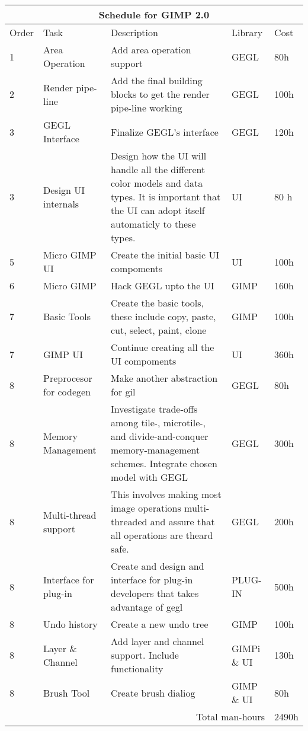
\begin{flushleft}		
\begin{tabular}{|l|p{3cm}|p{5cm}|l|l|}\hline
\multicolumn{5}{|c|}{\rule[-3mm]{0mm}{8mm} \large \bf Schedule for GIMP 2.0}\\  
\hline
Order & Task & Description & Library & Cost\\ \hline 

1 & Area Operation & Add area operation support & GEGL & 80h\\
\hline
2 & Render pipe-line & Add the final building blocks to get the render pipe-line working & GEGL & 100h\\
\hline
3 & GEGL Interface & Finalize GEGL's interface & GEGL & 120h\\
\hline 
3 & Design UI internals & Design how the UI will handle all the different color models and data types. It is important that the UI can adopt itself automaticly to these types. & UI & 80 h\\
\hline
5 & Micro GIMP UI & Create the initial basic UI compoments & UI & 100h\\  
\hline 
6 & Micro GIMP & Hack GEGL upto the UI & GIMP & 160h\\
\hline
7 & Basic Tools & Create the basic tools, these include copy, paste, cut, select, paint, clone & GIMP & 100h\\
\hline
7 & GIMP UI & Continue creating all the UI compoments & UI & 360h\\
\hline
8 & Preprocesor for codegen & Make another abstraction for gil & GEGL & 80h\\
\hline
8 & Memory Management & Investigate trade-offs among tile-, microtile-, and divide-and-conquer memory-management schemes. Integrate chosen model with GEGL & GEGL & 300h\\
\hline
8 & Multi-thread support & This involves making most image operations multi-threaded and assure that all operations are theard safe. & GEGL & 200h\\  
\hline
8 & Interface for plug-in & Create and design and interface for plug-in developers that takes advantage of gegl & PLUG-IN & 500h\\
\hline
8 & Undo history & Create a new undo tree & GIMP & 100h\\
\hline
 
8 & Layer \& Channel & Add layer and channel support. Include functionality & GIMPi \& UI & 130h \\
\hline
8 & Brush Tool & Create brush dialiog & GIMP \& UI & 80h\\
\hline 
\multicolumn{4}{|r|}{Total man-hours} & 2490h\\
\hline
\end{tabular}
\end{flushleft}

	
